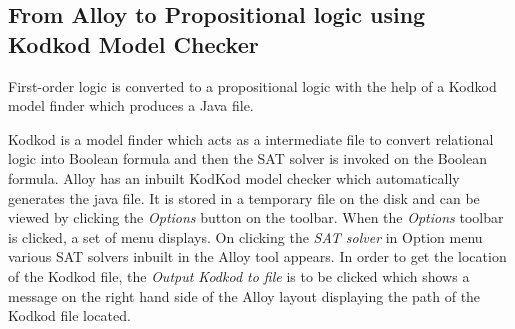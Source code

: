\documentclass[a4paper,12pt]{report}
\begin{document}
\subsection{From Alloy to Propositional logic using Kodkod Model Checker}
\label{Kodkod model checker}
First-order logic is converted to a propositional logic with the help of a Kodkod model finder which produces a Java file. 

Kodkod is a model finder which acts as a intermediate file to convert relational logic into Boolean formula and then the SAT solver is invoked on the Boolean formula. Alloy has an inbuilt KodKod model checker which automatically generates the java file. It is stored in a temporary file on the disk and can be viewed by clicking the \textit{Options} button on the toolbar. When the \textit{Options} toolbar is clicked, a set of menu displays. On clicking the \textit{SAT solver} in Option menu various SAT solvers inbuilt in the Alloy tool appears. In order to get the location of the Kodkod file, the \textit{Output Kodkod to file} is to be clicked which shows a message on the right hand side of the Alloy layout displaying the path of the Kodkod file located.
\end{document}
